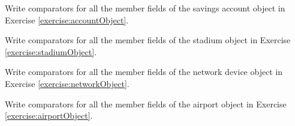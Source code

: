 \begin{exer}
Write comparators for all the member fields of the savings account
object in Exercise \ref{exercise:accountObject}.
\end{exer}

\begin{exer}
Write comparators for all the member fields of the stadium
object in Exercise \ref{exercise:stadiumObject}.
\end{exer}

\begin{exer}
Write comparators for all the member fields of the network device
object in Exercise \ref{exercise:networkObject}.
\end{exer}

\begin{exer}
Write comparators for all the member fields of the airport
object in Exercise \ref{exercise:airportObject}.
\end{exer}

